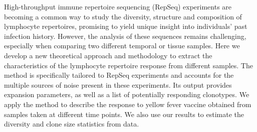 High-throughput immune repertoire sequencing (RepSeq) experiments are becoming a common way to study the diversity, structure and composition of lymphocyte repertoires, promising to yield unique insight into individuals' past infection history. However, the analysis of these sequences remains challenging, especially when comparing two different temporal or tissue samples. Here we develop a new theoretical approach and methodology to extract the characteristics of the lymphocyte repertoire response from different samples. The method is specifically tailored to RepSeq experiments and accounts for the multiple sources of noise present in these experiments. Its output provides expansion parameters, as well as a list of potentially responding clonotypes. We apply the method to describe the response to yellow fever vaccine obtained from samples taken at different time points. We also use our results to estimate the diversity and clone size statistics from data.
